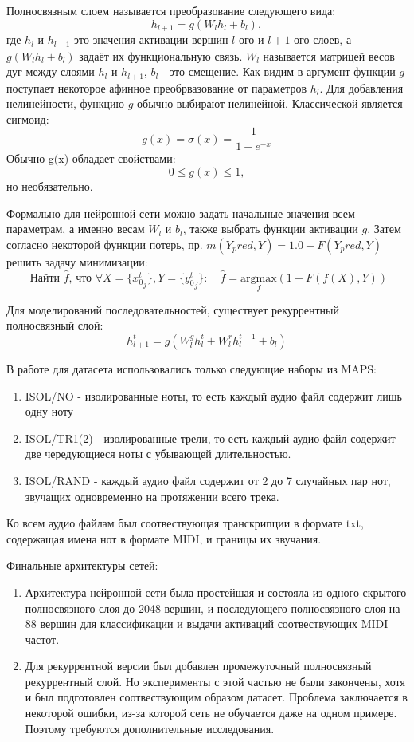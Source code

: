 Полносвязным слоем называется преобразование следующего вида:
\[
  h_{l + 1} = g(W_l h_l + b_l),
\]
где $h_l$ и $h_{l + 1}$ это значения активации вершин $l$-ого и  $l+1$-ого слоев,
а $g(W_l h_l + b_l)$ задаёт их функциональную связь.
$W_l$ называется матрицей весов дуг
между слоями $h_l$ и $h_{l + 1}$, $b_l$ - это смещение. Как видим
в аргумент функции $g$ поступает некоторое афинное преобрвазование
от параметров $h_l$.
Для добавления нелинейности, функцию $g$ обычно выбирают нелинейной.
Классической является сигмоид:
\[
  g(x) = \sigma (x) = \frac{1}{1 + e^{-x}}
\]
Обычно g(x) обладает свойствами:
\[
  0 \leq  g(x) \leq 1,
\]
но необязательно.

Формально для нейронной сети можно задать начальные значения всем параметрам,
а именно весам $W_l$ и $b_l$, также выбрать функции активации $g$.
Затем согласно некоторой функции потерь,
пр. $m(Y_pred, Y) = 1.0 - F(Y_pred, Y)$
решить задачу минимизации:
\[
  \text{ Найти $\hat f$, что } \forall X=\{{x_0^t}_j\}, Y=\{{y_0^t}_j\}: \quad
  \hat f = \underset{f}{\text{argmax}}(1 - F(f(X), Y))
\]

Для моделирований последовательностей, существует рекуррентный полносвязный
слой:
\[
  h_{l + 1}^t = g(W_l^g h_l^t + W_l^r h_l^{t - 1} + b_l)
\]

В работе для датасета использовались только следующие наборы из MAPS:
\begin{enumerate}
  \item ISOL/NO - изолированные ноты, то есть каждый аудио файл содержит лишь
    одну ноту
  \item ISOL/TR1(2) - изолированные трели, то есть каждый аудио файл содержит
    две чередующиеся ноты с убывающей длительностью.
  \item ISOL/RAND - каждый аудио файл содержит от 2 до 7 случайных пар нот,
    звучащих одновременно на протяжении всего трека.
\end{enumerate}

Ко всем аудио файлам был соотвествующая транскрипции в формате txt,
содержащая имена нот в формате MIDI, и границы их звучания.

Финальные архитектуры сетей:
\begin{enumerate}
  \item Архитектура нейронной сети была простейшая и состояла
    из одного скрытого полносвязного слоя до 2048 вершин,
    и последующего полносвязного слоя на 88 вершин для классификации
    и выдачи активаций соотвествующих MIDI частот.

  \item Для рекуррентной версии был добавлен промежуточный
    полносвязный рекуррентный слой. Но эксперименты с этой частью не были
    закончены, хотя и был подготовлен соотвествующим образом датасет. Проблема
    заключается в некоторой ошибки, из-за которой сеть не обучается даже
    на одном примере. Поэтому требуются дополнительные исследования.
\end{enumerate}

